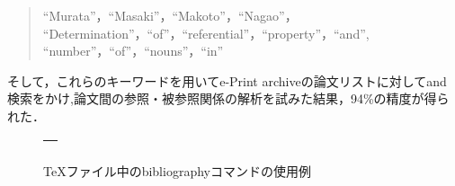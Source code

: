 \begin{quote}
 ``Murata''，``Masaki''，``Makoto''，``Nagao''，
 ``Determination''，``of''，``referential''，``property''，``and'',
 ``number''，``of''，``nouns''，``in''
\end{quote}

\begin{flushleft}
そして，これらのキーワードを用いてe-Print archiveの論文リストに対してand
検索をかけ,論文間の参照・被参照関係の解析を試みた結果，94\%の精度が得ら
れた．
\end{flushleft}

\begin{figure}[t]
\begin{center}
\begin{tabular}{|c|}\hline
\begin{minipage}[c]{13.5cm}
{\bf
\flushleft{
\vspace{0.3cm}
\begin{quote}
{\footnotesize
\begin{verbatim}
\bibitem[\protect\citename{Murata and Nagao}1993]{Murata:1993a}
Murata，Masaki and Makoto Nagao.
\newblock 1993.
\newblock Determination of referential property and number of nouns in
Japanese sentences for machine translation into English.
\newblock In {\em Proceedings of the Fifth International Conference on
Theoretical and Methodological Issues in Machine Translation (TMI~'93)}，
 pages 218--25, July.
\end{verbatim}
}
\end{quote}
}
}
\vspace{0.3cm}
\end{minipage}
 \\ \hline
\end{tabular}
\end{center}
\caption{\TeX ファイル中のbibliographyコマンドの使用例\label{fig:biblio}}
\end{figure}
\vspace{-0.5cm}

\normalsize

